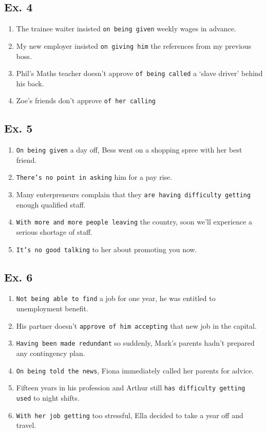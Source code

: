 \documentclass{article}
\begin{document}
\subsection{Ex. 4}
\begin{enumerate}
  \item The trainee waiter insisted {\tt on being given} weekly wages in advance.
  \item My new employer insisted {\tt on giving him} the references from my previous boss.
  \item Phil's Maths teacher doesn't approve {\tt of being called} a `slave driver' behind his back.
  \item Zoe's friends don't approve {\tt of her calling}
\end{enumerate}

\subsection{Ex. 5}
\begin{enumerate}
  \item {\tt On being given} a day off, Bess went on a shopping spree with her best friend.
  \item {\tt There's no point in asking} him for a pay rise.
  \item Many enterpreneurs complain that they {\tt are having difficulty getting} enough qualified staff.
  \item {\tt With more and more people leaving} the country, soon we'll experience a serious shortage of staff.
  \item {\tt It's no good talking} to her about promoting you now.
\end{enumerate}


\subsection{Ex. 6}
\begin{enumerate}
  \item {\tt Not being able to find} a job for one year, he was entitled to unemployment benefit.
  \item His partner doesn't {\tt approve of him accepting} that new job in the capital.
  \item {\tt Having been made redundant} so suddenly, Mark's parents hadn't prepared any contingency plan.
  \item {\tt On being told the news}, Fiona immediately called her parents for advice.
  \item Fifteen years in his profession and Arthur still {\tt has difficulty getting used} to night shifts.
  \item {\tt With her job getting} too stressful, Ella decided to take a year off and travel.
\end{enumerate}
\end{document}
